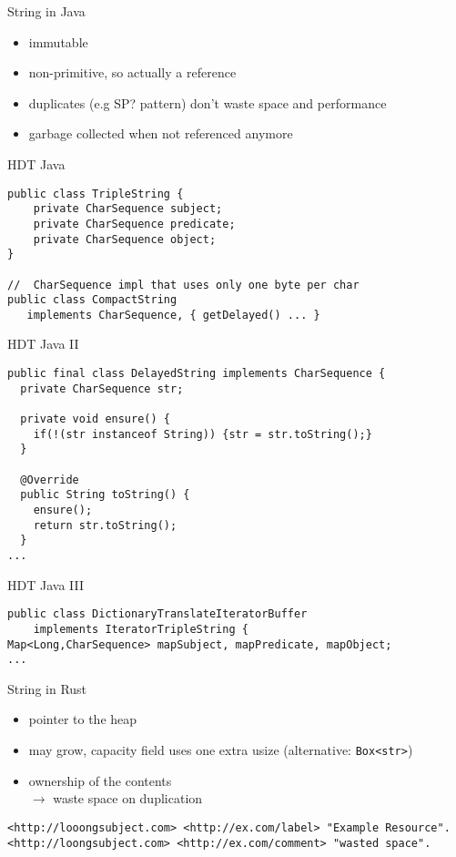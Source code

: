 \documentclass[14pt,aspectratio=169]{beamer}
\newcommand\pro{\item[$+$]}
\newcommand\con{\item[$-$]}
\begin{document}
\begin{frame}{String in Java}
\begin{itemize}
\pro immutable
\pro non-primitive, so actually a reference
\pro duplicates (e.g SP? pattern) don't waste space and performance
\pro garbage collected when not referenced anymore
\end{itemize}
\end{frame}

\begin{frame}[fragile]{HDT Java}
\small
\begin{verbatim}
public class TripleString {
    private CharSequence subject;
    private CharSequence predicate;
    private CharSequence object;
}

//  CharSequence impl that uses only one byte per char
public class CompactString
   implements CharSequence, { getDelayed() ... }
\end{verbatim}
\end{frame}

\begin{frame}[fragile]{HDT Java II}
\small
\begin{verbatim}
public final class DelayedString implements CharSequence {
  private CharSequence str;

  private void ensure() {
    if(!(str instanceof String)) {str = str.toString();}
  }

  @Override
  public String toString() {
    ensure();
    return str.toString();
  }
...
\end{verbatim}
\end{frame}

\begin{frame}[fragile]{HDT Java III}
\small
\begin{verbatim}
public class DictionaryTranslateIteratorBuffer
    implements IteratorTripleString {
Map<Long,CharSequence> mapSubject, mapPredicate, mapObject;
...
\end{verbatim}
\end{frame}

\begin{frame}[fragile]{String in Rust}
\begin{itemize}
\item pointer to the heap
\con may grow, capacity field uses one extra usize (alternative: \texttt{Box<str>})
\con ownership of the contents\\$\rightarrow$ waste space on duplication
\end{itemize}
\begin{verbatim}
<http://looongsubject.com> <http://ex.com/label> "Example Resource".
<http://loongsubject.com> <http://ex.com/comment> "wasted space".
\end{verbatim}
\end{frame}
\end{document}
